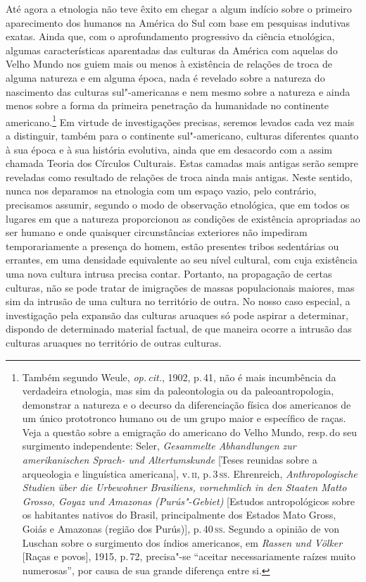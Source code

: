 Até agora a etnologia não teve êxito em chegar a algum indício sobre o
primeiro aparecimento dos humanos na América do Sul com base em
pesquisas indutivas exatas. Ainda que, com o aprofundamento progressivo
da ciência etnológica, algumas características aparentadas das culturas
da América com aquelas do Velho Mundo nos guiem mais ou menos à
existência de relações de troca de alguma natureza e em alguma época,
nada é revelado sobre a natureza do nascimento das
culturas sul"-americanas e nem mesmo sobre a natureza e ainda menos sobre
a forma da primeira penetração da humanidade no continente
americano.\footnote{Também segundo Weule, \textit{op.\,cit.}, 1902, p.\,41, não é mais incumbência
  da verdadeira etnologia, mas sim da paleontologia ou da
  paleoantropologia, demonstrar a natureza e o decurso da diferenciação
  física dos americanos de um único prototronco
  humano ou de um grupo maior e específico de raças.
  Veja a questão sobre a emigração do americano do Velho Mundo, resp.\,do
  seu surgimento independente: Seler, \textit{Gesammelte Abhandlungen zur
  amerikanischen Sprach- und Altertumskunde} {[}Teses reunidas sobre a
  arqueologia e linguística americana{]}, v.\,\textsc{ii}, p.\,3\,\textsc{ss}. Ehrenreich,
  \textit{Anthropologische Studien über die Urbewohner Brasiliens,
  vornehmlich in den Staaten Matto Grosso, Goyaz und Amazonas
  (Purús"-Gebiet)} {[}Estudos antropológicos sobre os habitantes nativos
  do Brasil, principalmente dos Estados Mato Gross, Goiás e Amazonas
  (região dos Purús){]}, p.\,40\,\textsc{ss}. Segundo a opinião de von Luschan
  sobre o surgimento dos índios americanos, em \textit{Rassen und Völker} {[}Raças e povos{]},
  1915, p.\,72, precisa"-se ``aceitar
  necessariamente raízes muito numerosas'', por causa de sua grande
  diferença entre si.} Em virtude de investigações precisas, seremos levados
cada vez mais a distinguir, também para o continente sul"-americano,
culturas diferentes quanto à sua época e à sua história evolutiva, ainda que em desacordo 
com a assim chamada Teoria dos Círculos
Culturais. Estas camadas mais antigas serão sempre reveladas como
resultado de relações de troca ainda mais antigas. Neste sentido, nunca nos deparamos na 
etnologia com um espaço vazio, pelo
contrário, precisamos assumir, segundo o modo de observação etnológica,
que em todos os lugares em que a natureza proporcionou as condições de
existência apropriadas ao ser humano e onde quaisquer circunstâncias
exteriores não impediram temporariamente a presença do homem, estão
presentes tribos sedentárias ou errantes, em uma densidade equivalente
ao seu nível cultural, com cuja existência uma nova cultura intrusa
precisa contar. Portanto, na propagação de certas culturas, não se pode
tratar de imigrações de massas populacionais maiores, mas sim da
intrusão de uma cultura no território de outra. No nosso caso especial,
a investigação pela expansão das culturas aruaques só pode aspirar a
determinar, dispondo de determinado material factual, de que maneira
ocorre a intrusão das culturas aruaques no território de outras
culturas.

